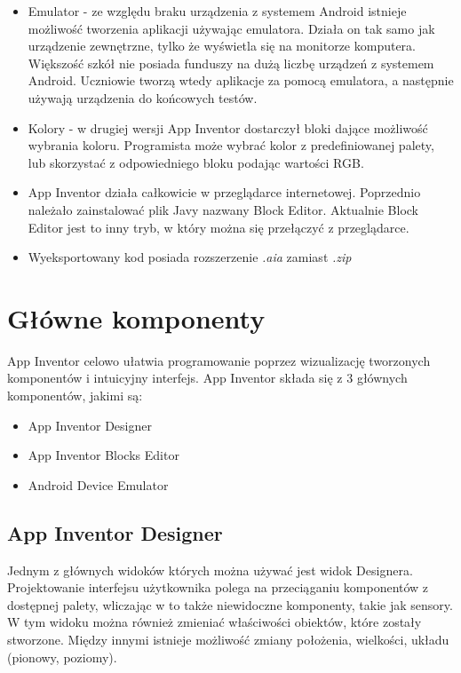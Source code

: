 \begin{itemize}
\item Emulator - ze względu braku urządzenia z systemem Android istnieje możliwość tworzenia aplikacji używając emulatora. Działa on tak samo jak urządzenie zewnętrzne, tylko że wyświetla się na monitorze komputera. Większość szkół nie posiada funduszy na dużą liczbę urządzeń z systemem Android. Uczniowie tworzą wtedy aplikacje za pomocą emulatora, a następnie używają urządzenia do końcowych testów.\cite{android:47}

\item Kolory - w drugiej wersji App Inventor dostarczył bloki dające możliwość wybrania koloru. Programista może wybrać kolor z predefiniowanej palety, lub skorzystać z odpowiedniego bloku podając wartości RGB.\cite{android:48}

\item App Inventor działa całkowicie w przeglądarce internetowej. Poprzednio należało zainstalować plik Javy nazwany Block Editor. Aktualnie Block Editor jest to inny tryb, w który można się przełączyć z przeglądarce.\cite{android:43}

\item Wyeksportowany kod posiada rozszerzenie \emph{.aia} zamiast \emph{.zip} \cite{android:43}

\end{itemize}

\section{Główne komponenty}
\label{c22}

App Inventor celowo ułatwia programowanie poprzez wizualizację tworzonych komponentów i intuicyjny interfejs. App Inventor składa się z 3 głównych komponentów, jakimi są:
\begin{itemize}
\item App Inventor Designer
\item App Inventor Blocks Editor
\item Android Device Emulator
\end{itemize}

\subsection{App Inventor Designer}
\label{c221}

Jednym z głównych widoków których można używać jest widok Designera. Projektowanie interfejsu użytkownika polega na przeciąganiu komponentów z dostępnej palety, wliczając w to także niewidoczne komponenty, takie jak sensory. W tym widoku można również zmieniać właściwości obiektów, które zostały stworzone. Między innymi istnieje możliwość zmiany położenia, wielkości, układu (pionowy, poziomy).

